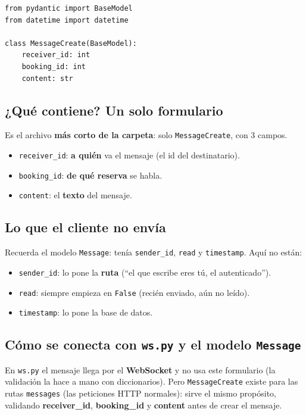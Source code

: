 \documentclass[11pt,a4paper]{article}
\begin{document}
\begin{lstlisting}
from pydantic import BaseModel
from datetime import datetime

class MessageCreate(BaseModel):
    receiver_id: int
    booking_id: int
    content: str
\end{lstlisting}

\subsection{¿Qué contiene? Un solo formulario}

Es el archivo \textbf{más corto de la carpeta}: solo \texttt{MessageCreate}, con 3 campos.
\begin{itemize}
    \item \texttt{receiver\_id}: \textbf{a quién} va el mensaje (el id del destinatario).
    \item \texttt{booking\_id}: \textbf{de qué reserva} se habla.
    \item \texttt{content}: el \textbf{texto} del mensaje.
\end{itemize}

\subsection{Lo que el cliente \textbf{no} envía}

Recuerda el modelo \texttt{Message}: tenía \texttt{sender\_id}, \texttt{read} y
\texttt{timestamp}. Aquí no están:
\begin{itemize}
    \item \texttt{sender\_id}: lo pone la \textbf{ruta} (``el que escribe eres tú, el autenticado'').
    \item \texttt{read}: siempre empieza en \texttt{False} (recién enviado, aún no leído).
    \item \texttt{timestamp}: lo pone la base de datos.
\end{itemize}

\subsection{Cómo se conecta con \texttt{ws.py} y el modelo \texttt{Message}}

En \texttt{ws.py} el mensaje llega por el \textbf{WebSocket} y no usa este formulario
(la validación la hace a mano con diccionarios). Pero \texttt{MessageCreate} existe para las
rutas \texttt{messages} (las peticiones HTTP normales): sirve el mismo propósito, validando
\textbf{receiver\_id}, \textbf{booking\_id} y \textbf{content} antes de crear el mensaje.
\end{document}
